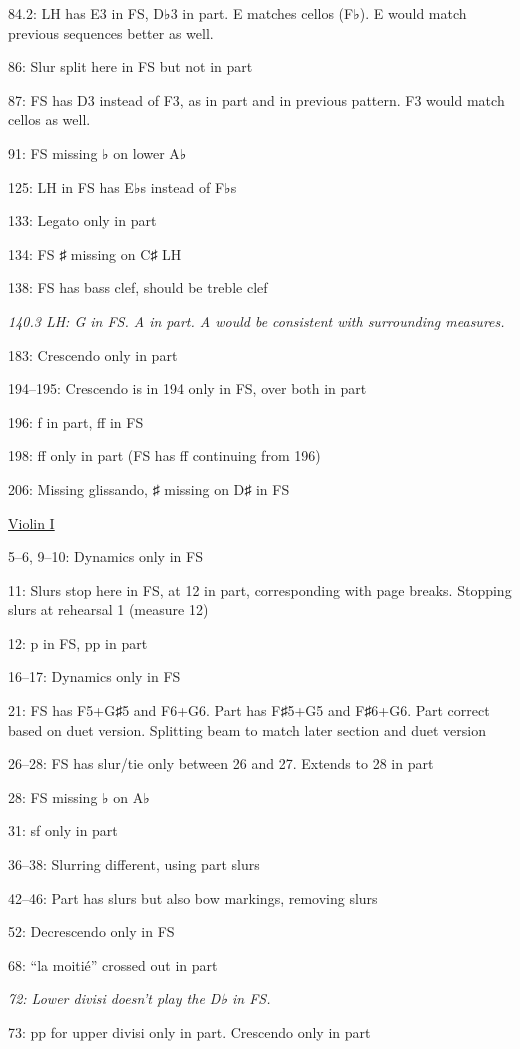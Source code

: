 \documentclass[twoside]{article}
\begin{document}
\begin{hangparas}{15pt}{1}
\begin{multicols}{2}
84.2: LH has E3 in FS, D♭3 in part. E matches cellos (F♭). E would match previous sequences better as well.

86: Slur split here in FS but not in part

87: FS has D3 instead of F3, as in part and in previous pattern. F3 would match cellos as well.

91: FS missing ♭ on lower A♭

125: LH in FS has E♭s instead of F♭s

133: Legato only in part

134: FS ♯ missing on C♯ LH

138: FS has bass clef, should be treble clef

\textit{140.3 LH: G in FS. A in part. A would be consistent with surrounding measures.}

183: Crescendo only in part

194--195: Crescendo is in 194 only in FS, over both in part

196: f in part, ff in FS

198: ff only in part (FS has ff continuing from 196)

206: Missing glissando, ♯ missing on D♯ in FS

\underline{Violin I}

5--6, 9--10: Dynamics only in FS

11: Slurs stop here in FS, at 12 in part, corresponding with page breaks. Stopping slurs at rehearsal 1 (measure 12)

12: p in FS, pp in part

16--17: Dynamics only in FS

21: FS has F5+G♯5 and F6+G6. Part has F♯5+G5 and F♯6+G6. Part correct based on duet version. Splitting beam to match later section and duet version

26--28: FS has slur/tie only between 26 and 27. Extends to 28 in part

28: FS missing ♭ on A♭

31: sf only in part

36--38: Slurring different, using part slurs

42--46: Part has slurs but also bow markings, removing slurs

52: Decrescendo only in FS

68: ``la moitié'' crossed out in part

\textit{72: Lower divisi doesn't play the D♭ in FS.}

73: pp for upper divisi only in part. Crescendo only in part


\end{multicols}
\end{hangparas}
\end{document}
